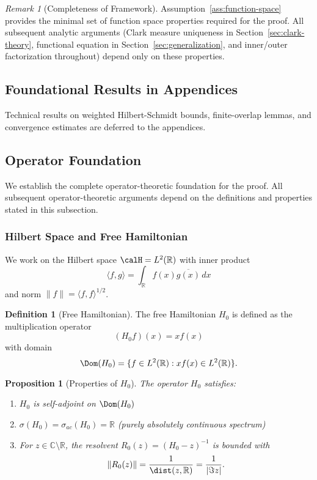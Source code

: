 ﻿\documentclass[12pt,a4paper]{article}
\newtheorem{proposition}[theorem]{Proposition}
\theoremstyle{definition}
\newtheorem{definition}[theorem]{Definition}
\theoremstyle{remark}
\newtheorem{remark}[theorem]{Remark}
\newcommand{\CC}{\mathbb{C}}
\newcommand{\RR}{\mathbb{R}}
\begin{document}
\begin{remark}[Completeness of Framework]
\label{rem:framework-completeness}
Assumption~\ref{ass:function-space} provides the minimal set of function space properties required for the proof. All subsequent analytic arguments (Clark measure uniqueness in Section~\ref{sec:clark-theory}, functional equation in Section~\ref{sec:generalization}, and inner/outer factorization throughout) depend only on these properties.
\end{remark}

\subsection{Foundational Results in Appendices}
Technical results on weighted Hilbert-Schmidt bounds, finite-overlap lemmas, and convergence estimates are deferred to the appendices.

\subsection{Operator Foundation}
\label{subsec:operator-foundation}

We establish the complete operator-theoretic foundation for the proof. All subsequent operator-theoretic arguments depend on the definitions and properties stated in this subsection.

\subsubsection{Hilbert Space and Free Hamiltonian}

We work on the Hilbert space $\calH = L^2(\RR)$ with inner product
\[
\langle f, g \rangle = \int_\RR f(x)\overline{g(x)} \, dx
\]
and norm $\|f\| = \langle f, f \rangle^{1/2}$.

\begin{definition}[Free Hamiltonian]
\label{def:free-hamiltonian}
The free Hamiltonian $H_0$ is defined as the multiplication operator
\[
(H_0 f)(x) = x f(x)
\]
with domain
\[
\Dom(H_0) = \{f \in L^2(\RR) : xf(x) \in L^2(\RR)\}.
\]
\end{definition}

\begin{proposition}[Properties of $H_0$]
\label{prop:H0-properties}
The operator $H_0$ satisfies:
\begin{enumerate}
\item $H_0$ is self-adjoint on $\Dom(H_0)$
\item $\sigma(H_0) = \sigma_{ac}(H_0) = \RR$ (purely absolutely continuous spectrum)
\item For $z \in \CC \setminus \RR$, the resolvent $R_0(z) = (H_0 - z)^{-1}$ is bounded with
\[
\|R_0(z)\| = \frac{1}{\dist(z, \RR)} = \frac{1}{|\Im z|}.
\]
\end{enumerate}
\end{proposition}
\end{document}
